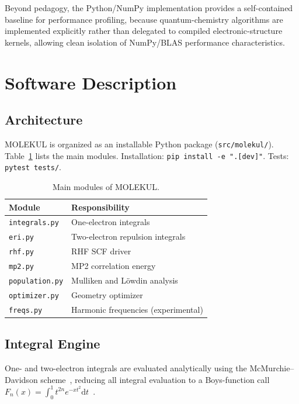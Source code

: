 \documentclass[1p,times]{elsarticle}
\begin{document}
Beyond pedagogy, the Python/NumPy implementation provides a self-contained
baseline for performance profiling, because quantum-chemistry algorithms are
implemented explicitly rather than delegated to compiled electronic-structure
kernels, allowing clean isolation of NumPy/BLAS performance characteristics.

\section{Software Description}

\subsection{Architecture}

MOLEKUL is organized as an installable Python package (\texttt{src/molekul/}).
Table~\ref{tab:modules} lists the main modules.
Installation: \texttt{pip install -e ".[dev]"}.
Tests: \texttt{pytest tests/}.

\begin{table}[H]
\caption{Main modules of MOLEKUL.}
\label{tab:modules}
\begin{tabularx}{\columnwidth}{lX}
\toprule
\textbf{Module} & \textbf{Responsibility} \\
\midrule
\texttt{integrals.py}   & One-electron integrals \\
\texttt{eri.py}         & Two-electron repulsion integrals \\
\texttt{rhf.py}         & RHF SCF driver \\
\texttt{mp2.py}         & MP2 correlation energy \\
\texttt{population.py}  & Mulliken and L{\"o}wdin analysis \\
\texttt{optimizer.py}   & Geometry optimizer \\
\texttt{freqs.py}       & Harmonic frequencies (experimental) \\
\bottomrule
\end{tabularx}
\end{table}

\subsection{Integral Engine}

One- and two-electron integrals are evaluated analytically using the
McMurchie--Davidson scheme~\cite{mcmurchie1978,helgaker2000}, reducing all
integral evaluation to a Boys-function call
$F_n(x)=\int_0^1 t^{2n}e^{-xt^2}\mathrm{d}t$~\cite{boys1950}.
\end{document}
